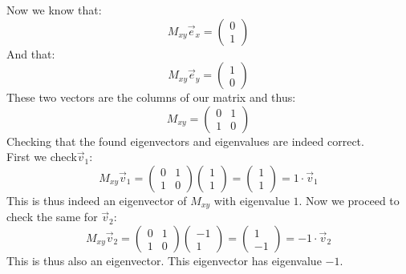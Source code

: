 \documentclass[a4paper]{report}
\begin{document}
\begin{Answer}[ref=eigen2]
\begin{tikzpicture}
\end{tikzpicture}
Now we know that:
\begin{equation*}
M_{xy}\vec{e}_x=\begin{pmatrix}0\\1\end{pmatrix}
\end{equation*}
And that:
\begin{equation*}
M_{xy}\vec{e}_y=\begin{pmatrix}1\\0\end{pmatrix}
\end{equation*}
These two vectors are the columns of our matrix and thus:
\begin{equation*}
M_{xy}=\begin{pmatrix}0&1\\1&0\end{pmatrix}
\end{equation*}
\Question Checking that the found eigenvectors and eigenvalues are indeed correct.\\
First we check$ \vec{v}_1$:
\begin{equation*}
M_{xy}\vec{v}_1=\begin{pmatrix}0&1\\1&0\end{pmatrix}\begin{pmatrix}1\\1\end{pmatrix}=\begin{pmatrix}1\\1\end{pmatrix}=1 \cdot \vec{v}_1
\end{equation*}
This is thus indeed an eigenvector of $M_{xy}$ with eigenvalue $1$. Now we proceed to check the same for $\vec{v}_2$:
\begin{equation*}
M_{xy}\vec{v}_2=\begin{pmatrix}0&1\\1&0\end{pmatrix}\begin{pmatrix}-1\\1\end{pmatrix}=\begin{pmatrix}1\\-1\end{pmatrix}=-1 \cdot \vec{v}_2
\end{equation*}
This is thus also an eigenvector. This eigenvector has eigenvalue $-1$.
\end{Answer}
\end{document}
